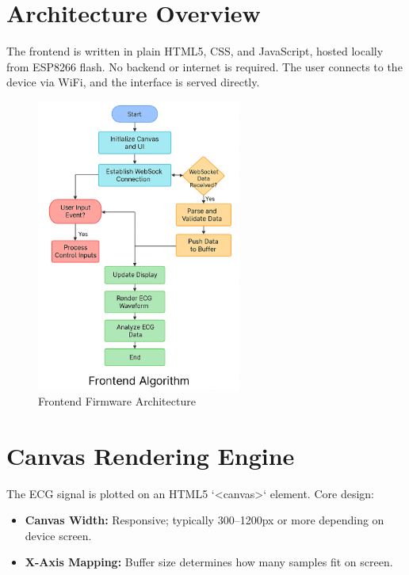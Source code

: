 \section{Architecture Overview}
The frontend is written in plain HTML5, CSS, and JavaScript, hosted locally from ESP8266 flash. No backend or internet is required. The user connects to the device via WiFi, and the interface is served directly.

\begin{figure}[H]
\centering
\includegraphics[width=0.6\textwidth]{images/firmware-diagram(frontend).png}
\caption{Frontend Firmware Architecture}
\label{fig:firm_frontend_diagram}
\end{figure}

\section{Canvas Rendering Engine}
The ECG signal is plotted on an HTML5 `<canvas>` element. Core design:
\begin{itemize}
    \item \textbf{Canvas Width:} Responsive; typically 300–1200px or more depending on device screen.
    \item \textbf{X-Axis Mapping:} Buffer size determines how many samples fit on screen.
\end{itemize}


